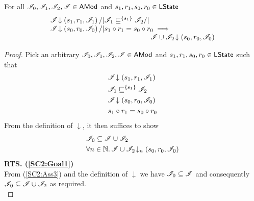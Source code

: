 %
%
%
%
%
%
\begin{lemma}\label{lem:shift-closure-2}
For all $\mathscr{I}_0, \mathscr{I}_1, \mathscr{I}_2, \mathscr{I} \in \textsf{AMod}$ and  $s_1, r_1, s_0, r_0 \in \textsf{LState}$
%
\[
\begin{array}{@{} l @{\hspace{-1cm}} l @{} } 
	\extendsAM{\lmod}{s_1}{r_1}{\lmod_1} /| \lmod_1 \weakenI{\{s_1\}} \lmod_2 /| \null & \\
	\extendsAM{\lmod}{s_0}{r_0}{\lmod_0} /| s_1 \composeL r_1 = s_0 \composeL r_0 \implies & \\
	&\extendsAM{\lmod \cup \lmod_2}{s_0}{r_0}{\lmod_0}
\end{array}
\]
%
\begin{proof} Pick an arbitrary $\mathscr{I}_0, \mathscr{I}_1, \mathscr{I}_2, \mathscr{I} \in \textsf{AMod}$ and $s_1, r_1, s_0, r_0 \in \textsf{LState}$ such that 
%
\begin{align}
	& \mathscr{I} \!\downarrow \left(s_1, r_1, \mathscr{I}_1\right) \label{SC2:Ass1}\\
	& \mathscr{I}_1 \sqsubseteq^{\{s_1\}} \mathscr{I}_2 \label{SC2:Ass2}\\
	& \mathscr{I} \!\downarrow \left(s_0, r_0, \mathscr{I}_0\right) \label{SC2:Ass3}\\
	& s_1 \circ r_1 = s_0 \circ r_0 \label{SC2:Ass4}
\end{align} 
%
From the definition of $\downarrow$, it then suffices to show
%
\begin{align}
	& \mathscr{I}_0 \subseteq \mathscr{I} \cup \mathscr{I}_2\label{SC2:Goal1}\\
	& \forall n \in \mathbb{N}.\,  \mathscr{I} \cup \mathscr{I}_2 \!\downarrow_{n} \left(s_0, r_0, \mathscr{I}_0\right) \label{SC2:Goal2}
\end{align}
%
\noindent\textbf{RTS. (\ref{SC2:Goal1})} \\
From (\ref{SC2:Ass3}) and the definition of $\downarrow$ we have $\mathscr{I}_0 \subseteq \mathscr{I}$ and consequently $\mathscr{I}_0 \subseteq \mathscr{I} \cup \mathscr{I}_2$ as required.\\


\end{proof}
\end{lemma}
